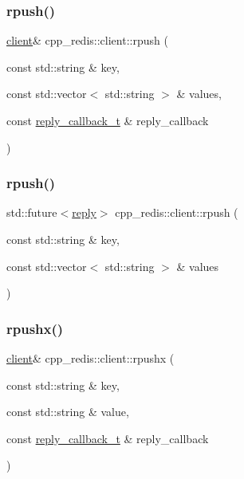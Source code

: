 \subsubsection{\texorpdfstring{rpush()}{rpush()}\hspace{0.1cm}{\footnotesize\ttfamily [1/2]}}
{\footnotesize\ttfamily \hyperlink{classcpp__redis_1_1client}{client}\& cpp\+\_\+redis\+::client\+::rpush (\begin{DoxyParamCaption}\item[{const std\+::string \&}]{key,  }\item[{const std\+::vector$<$ std\+::string $>$ \&}]{values,  }\item[{const \hyperlink{classcpp__redis_1_1client_a061a1140d36d2eaeda82b09a0bb3f9f2}{reply\+\_\+callback\+\_\+t} \&}]{reply\+\_\+callback }\end{DoxyParamCaption})}

\mbox{\label{classcpp__redis_1_1client_a1e135e9e69a92a0b54059d5f81f9ff25}} 
\subsubsection{\texorpdfstring{rpush()}{rpush()}\hspace{0.1cm}{\footnotesize\ttfamily [2/2]}}
{\footnotesize\ttfamily std\+::future$<$\hyperlink{classcpp__redis_1_1reply}{reply}$>$ cpp\+\_\+redis\+::client\+::rpush (\begin{DoxyParamCaption}\item[{const std\+::string \&}]{key,  }\item[{const std\+::vector$<$ std\+::string $>$ \&}]{values }\end{DoxyParamCaption})}

\mbox{\label{classcpp__redis_1_1client_a051fdb76cf3d40bd7c0ea0dcb0eed36e}} 
\subsubsection{\texorpdfstring{rpushx()}{rpushx()}\hspace{0.1cm}{\footnotesize\ttfamily [1/2]}}
{\footnotesize\ttfamily \hyperlink{classcpp__redis_1_1client}{client}\& cpp\+\_\+redis\+::client\+::rpushx (\begin{DoxyParamCaption}\item[{const std\+::string \&}]{key,  }\item[{const std\+::string \&}]{value,  }\item[{const \hyperlink{classcpp__redis_1_1client_a061a1140d36d2eaeda82b09a0bb3f9f2}{reply\+\_\+callback\+\_\+t} \&}]{reply\+\_\+callback }\end{DoxyParamCaption})}

